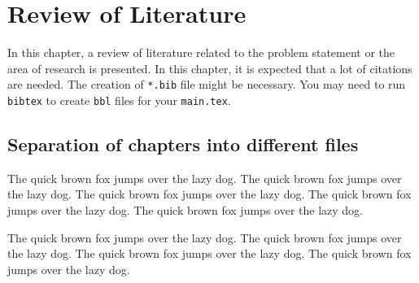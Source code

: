 \chapter{Review of Literature}

In this chapter, a review of literature related to the problem
statement or the area of research is presented.  In this chapter,
it is expected that a lot of citations are needed.  The creation
of \verb+*.bib+ file might be necessary.  You may need to run
\verb+bibtex+ to create \verb+bbl+ files for your \verb+main.tex+.

\section{Separation of chapters into different files}

\hspace{\parindent} The quick brown fox jumps over the lazy dog.
The quick brown fox jumps over the lazy dog. The quick brown fox
jumps over the lazy dog. The quick brown fox jumps over the lazy
dog. The quick brown fox jumps over the lazy dog.

The quick brown fox jumps over the lazy dog. The quick brown fox
jumps over the lazy dog. The quick brown fox jumps over the lazy
dog. The quick brown fox jumps over the lazy dog.
